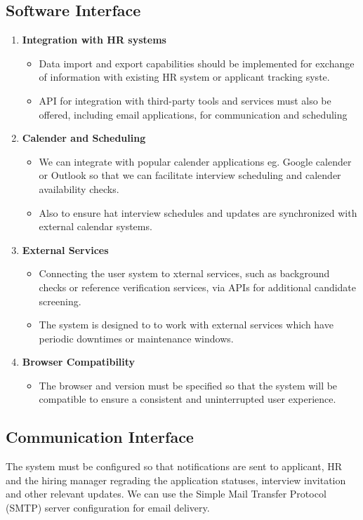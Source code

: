 \subsection{Software Interface}
\begin{enumerate}
    \item \textbf{Integration with HR systems}
    \begin{itemize}
	    \item Data import and export capabilities should be implemented for exchange of information with existing HR system or applicant tracking syste.
	    \item API for integration with third-party tools and services must also be offered, including email applications, for communication and scheduling
    \end{itemize}
    \item \textbf{Calender and Scheduling}
		\begin{itemize}
			\item We can integrate with popular calender applications eg. Google calender or Outlook so that we can facilitate interview scheduling and calender availability checks.
			\item Also to ensure hat interview schedules and updates are synchronized with external calendar systems.
		\end{itemize}
    \item \textbf{External Services}
		\begin{itemize}
			\item Connecting the user system to xternal services, such as background checks or reference verification services, via APIs for additional candidate screening.
			\item The system is designed to to work with external services which have periodic downtimes or maintenance windows.
		\end{itemize}
    \item \textbf{Browser Compatibility}
		\begin{itemize}
			\item The browser and version must be specified so that the system will be compatible to ensure a consistent and uninterrupted user experience.
		\end{itemize}
\end{enumerate}

\subsection{Communication Interface}
The system must be configured so that notifications are sent to applicant, HR and the hiring manager regrading the application statuses, interview invitation and other relevant updates. We can use the Simple Mail Transfer Protocol (SMTP) server configuration for email delivery.



